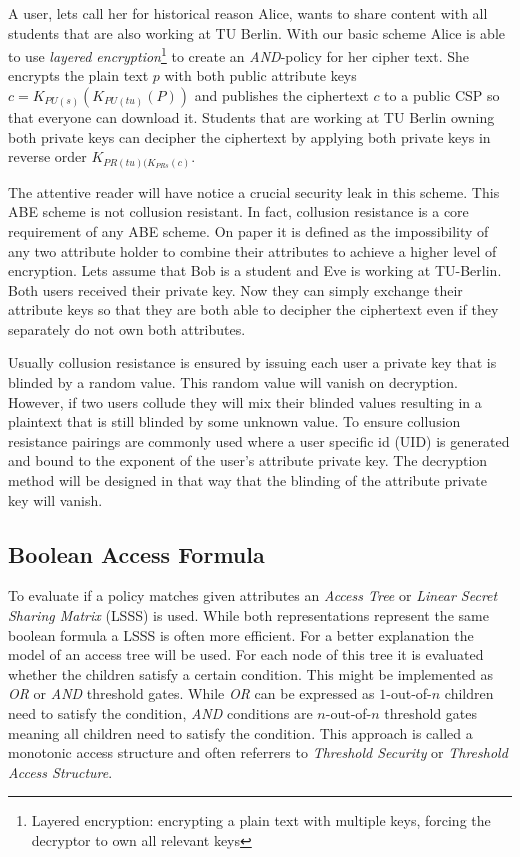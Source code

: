 A user, lets call her for historical reason Alice, wants to share content with all students that are also working at TU Berlin. With our basic scheme Alice is able to use \textit{layered encryption}\footnote{Layered encryption: encrypting a plain text with multiple keys, forcing the decryptor to own all relevant keys} to create an \textit{AND}-policy for her cipher text. She encrypts the plain text $p$ with both public attribute keys $c = K_{PU(s)}(K_{PU(tu)}(P))$ and publishes the ciphertext $c$ to a public CSP so that everyone can download it. Students that are working at TU Berlin owning both private keys can decipher the ciphertext by applying both private keys in reverse order $K_{PR(tu)(K_{PR{s}}(c)}$.

The attentive reader will have notice a crucial security leak in this scheme. This \ac{ABE} scheme is not collusion resistant. In fact, collusion resistance is a core requirement of any ABE scheme. On paper it is defined as the impossibility of any two attribute holder to combine their attributes to achieve a higher level of encryption. Lets assume that Bob is a student and Eve is working at \ac{TU}-Berlin. Both users received their private key. Now they can simply exchange their attribute keys so that they are both able to decipher the ciphertext even if they separately do not own both attributes.  

Usually collusion resistance is ensured by issuing each user a private key that is blinded by a random value. This random value will vanish on decryption. However, if two users collude they will mix their blinded values resulting in a plaintext that is still blinded by some unknown value. To ensure collusion resistance pairings are commonly used where a user specific id (\ac{UID}) is generated and bound to the exponent of the user's attribute private key. The decryption method will be designed in that way that the blinding of the attribute private key will vanish. 

\subsection{Boolean Access Formula}
To evaluate if a policy matches given attributes an \textit{Access Tree} or \textit{Linear Secret Sharing Matrix} (\ac{LSSS}) is used. While both representations represent the same boolean formula a \ac{LSSS} is often more efficient. For a better explanation the model of an access tree will be used. For each node of this tree it is evaluated whether the children satisfy a certain condition. This might be implemented as \textit{OR} or \textit{AND} threshold gates. While \textit{OR} can be expressed as $1$-out-of-$n$ children need to satisfy the condition, \textit{AND} conditions are $n$-out-of-$n$ threshold gates meaning all children need to satisfy the condition. This approach is called a monotonic access structure and often referrers to \textit{Threshold Security} or \textit{Threshold Access Structure}. 

